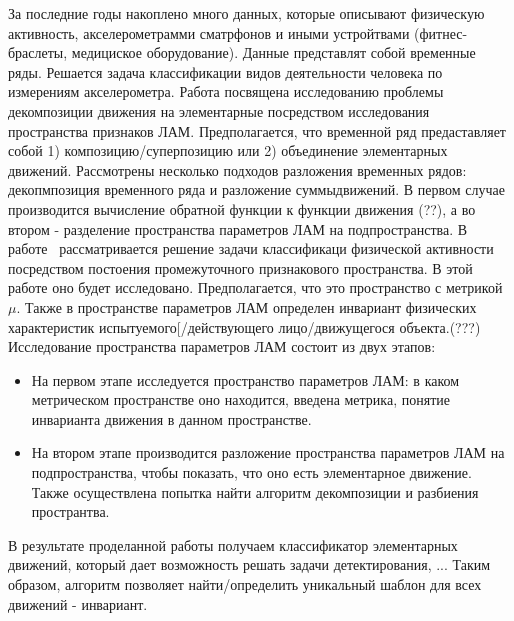 \documentclass[12pt, fleqn, unicode]{article}
\begin{document}
За последние годы накоплено много данных, которые описывают физическую активность, акселерометрамми сматрфонов и иными устройтвами
(фитнес-браслеты, медициское оборудование). Данные представлят собой
временные ряды. Решается задача классификации видов деятельности человека по измерениям акселерометра. Работа посвящена исследованию проблемы декомпозиции движения на элементарные посредством исследования пространства признаков ЛАМ.
Предполагается, что временной ряд предаставляет собой 1) композицию/суперпозицию или 2)  объединение элементарных движений.
 Рассмотрены несколько подходов разложения временных рядов: декопмпозиция временного ряда и разложение суммы движений. В первом случае производится вычисление обратной функции к функции движения (??), а во втором - разделение пространства параметров ЛАМ на подпространства.   
В работе~\cite{Kuznetsov2015} рассматривается решение задачи классификаци физической активности посредством постоения промежуточного признакового пространства. В этой работе оно будет исследовано. Предполагается, что это пространство с метрикой $\mu$. Также в пространстве параметров ЛАМ определен инвариант физических характеристик испытуемого[/действующего лицо/движущегося объекта.(???)  
Исследование пространства параметров ЛАМ состоит из двух этапов:
\begin{itemize}
    \item На первом этапе исследуется пространство параметров ЛАМ: в каком метрическом пространстве оно находится, введена метрика, понятие инварианта движения в данном пространстве.
    \item На втором этапе производится разложение пространства параметров ЛАМ на подпространства, чтобы показать, что оно есть элементарное движение. Также осуществлена попытка найти алгоритм декомпозиции и разбиения пространтва.
\end{itemize}

В результате проделанной работы получаем классификатор элементарных движений, который дает возможность решать задачи детектирования, ...
Таким образом, алгоритм позволяет найти/определить уникальный шаблон для всех движений - инвариант.
\end{document}

